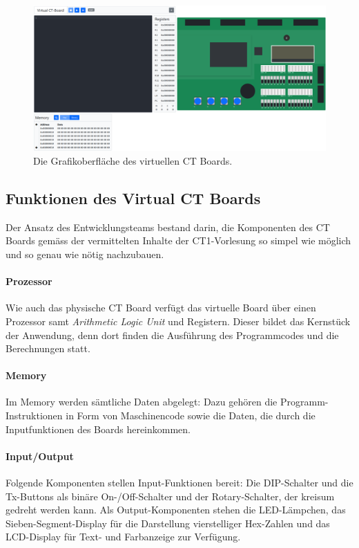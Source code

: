 \documentclass[10pt]{article}
\begin{document}
\begin{figure}[h]
\includegraphics[width=\textwidth]{final}
\caption[size=8pt]{Die Grafikoberfläche des virtuellen CT Boards.}
\label{final}
\end{figure}

\subsection{Funktionen des \glqq Virtual CT Boards\grqq}

Der Ansatz des Entwicklungsteams bestand darin, die Komponenten des CT Boards gemäss der vermittelten Inhalte der CT1-Vorlesung so simpel wie möglich und so genau wie nötig nachzubauen.

\paragraph{Prozessor} Wie auch das physische CT Board verfügt das virtuelle Board über einen Prozessor samt \emph{Arithmetic Logic Unit} und Registern. Dieser bildet das Kernstück der Anwendung, denn dort finden die Ausführung des Programmcodes und die Berechnungen statt. 

\paragraph{Memory} Im Memory werden sämtliche Daten abgelegt: Dazu gehören die Programm-Instruktionen in Form von Maschinencode sowie die Daten, die durch die Inputfunktionen des Boards hereinkommen.

\paragraph{Input/Output} Folgende Komponenten stellen Input-Funktionen bereit: Die DIP-Schalter und die Tx-Buttons als binäre On-/Off-Schalter und der Rotary-Schalter, der kreisum gedreht werden kann. Als Output-Komponenten stehen die LED-Lämpchen, das Sieben-Segment-Display für die Darstellung vierstelliger Hex-Zahlen und das LCD-Display für Text- und Farbanzeige zur Verfügung.
\end{document}
